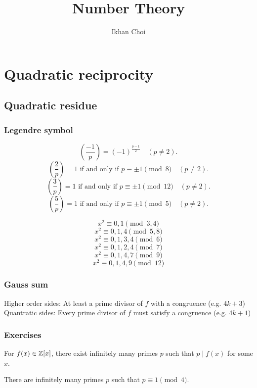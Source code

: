 \documentclass{../note}
\begin{document}
\title{Number Theory}
\author{Ikhan Choi}
\maketitle
\tableofcontents

\part{Quadratic reciprocity}
\chapter{Quadratic residue}
\section{Legendre symbol}
\begin{prb}
\[\left(\frac{-1}p\right)=(-1)^{\frac{p-1}2}\quad(p\ne2).\]
\[\left(\frac2p\right)=1\text{ if and only if }p\equiv\pm1\pmod8\quad(p\ne2).\]
\[\left(\frac3p\right)=1\text{ if and only if }p\equiv\pm1\pmod{12}\quad(p\ne2).\]
\[\left(\frac5p\right)=1\text{ if and only if }p\equiv\pm1\pmod5\quad(p\ne2).\]
\end{prb}
\begin{prb}
\[x^2\equiv0,1\pmod{3,4}\]
\[x^2\equiv0,1,4\pmod{5,8}\]
\[x^2\equiv0,1,3,4\pmod{6}\]
\[x^2\equiv0,1,2,4\pmod{7}\]
\[x^2\equiv0,1,4,7\pmod{9}\]
\[x^2\equiv0,1,4,9\pmod{12}\]
\end{prb}


\section{Gauss sum}





Higher order sides: At least a prime divisor of $f$ with a congruence (e.g. $4k+3$)
Quantratic sides: Every prime divisor of $f$ must satisfy a congruence (e.g. $4k+1$)


\section*{Exercises}
\begin{prb}
\begin{parts}
\item For $f(x)\in\mathbb{Z}[x]$, there exist infinitely many primes $p$ such that $p\mid f(x)$ for some $x$.
\item There are infinitely many primes $p$ such that $p\equiv1\pmod4$.
\end{parts}
\end{prb}
\end{document}

